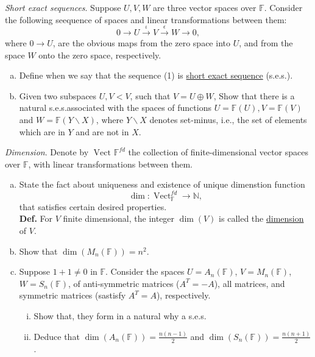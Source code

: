 \documentclass{article}
\begin{document}
\begin{problem}
    \textit{Short exact sequences}. Suppose $U,V,W$ are three vector spaces over $\mathbb{F}$. Consider the following seequence of spaces and linear transformations between them:
    \begin{equation}
        0 \xrightarrow{} U \xrightarrow{\iota} V \xrightarrow{\epsilon} W \xrightarrow{} 0,
    \end{equation}
    where $0 \to U$, are the obvious maps from the zero space into $U$, and from the space $W$ onto the zero space, respectively. \\
    \begin{enumerate}[a)]
        \item Define when we say that the sequence (1) is \underline{short exact sequence} (s.e.s.).
        \item Given two subspaces $U,V < V$, such that $V = U \oplus W$, Show that there is a natural s.e.s.associated with the spaces of functions $U = \mathbb{F}(U), V = \mathbb{F}(V)$ and $W = \mathbb{F}(Y \backslash X)$, where $Y \backslash X$ denotes set-minus, i.e., the set of elements which are in $Y$ and are not in $X$.
    \end{enumerate}
\end{problem}


\begin{problem}
    \textit{Dimension}. Denote by $\operatorname{Vect}_{}\mathbb{F}^{fd}$ the collection of finite-dimensional vector spaces over $\mathbb{F}$, with linear transformations between them.
    \begin{enumerate}[a)]
        \item State the fact about uniqueness and existence of unique dimenstion function
        \[
            \dim: \operatorname{Vect}_\mathbb{F}^{fd} \to \mathbb{N},
        \]
        that satisfies certain desired properties. \\
        \textbf{Def.} For $V$ finite dimensional, the integer $\dim(V)$ is called the \underline{dimension} of $V$.
        \item Show that $\dim(M_n(\mathbb{F})) = n^2$.
        \item Suppose $1 + 1 \neq 0$ in $\mathbb{F}$. Consider the spaces $U = A_n(\mathbb{F})$, $V = M_n(\mathbb{F})$, $W = S_n(\mathbb{F})$, of anti-symmetric matrices ($A^T = -A$), all matrices, and symmetric matrices (sastisfy $A^T = A$), respectively. 
        \begin{enumerate}[i)]
            \item Show that, they form in a natural why a s.e.s.
            \item Deduce that $\dim(A_n(\mathbb{F})) = \frac{n(n-1)}{2}$ and $\dim(S_n(\mathbb{F})) = \frac{n(n+1)}{2}$.
        \end{enumerate}
    \end{enumerate}
\end{problem}
\end{document}
